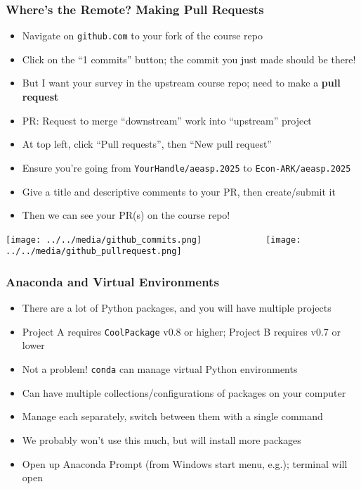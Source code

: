 \documentclass[aspectratio=169]{beamer}
\begin{document}
\begin{frame}
\frametitle{Where's the Remote? Making Pull Requests}
\begin{itemize}
	\item Navigate on \texttt{github.com} to your fork of the course repo
	
	\item Click on the ``1 commits'' button; the commit you just made should be there!
	
	\item <2->But I want your survey in the upstream course repo; need to make a \textbf{pull request}
	
	\item <2->PR: Request to merge ``downstream'' work into ``upstream'' project
	
	\item <3->At top left, click ``Pull requests'', then ``New pull request''
	
	\item <3->Ensure you're going from \texttt{YourHandle/aeasp.2025} to \texttt{Econ-ARK/aeasp.2025}
	
	\item <3->Give a title and descriptive comments to your PR, then create/submit it
	
	\item <4->Then we can see your PR(s) on the course repo!
\end{itemize}

\texttt{[image: ../../media/github\_commits.png]}~~~~~~~~~~~~~\texttt{[image: ../../media/github\_pullrequest.png]}

\end{frame}


\begin{frame}
\frametitle{Anaconda and Virtual Environments}
\begin{itemize}
	\item There are a lot of Python packages, and you will have multiple projects
	
	\item Project A requires \texttt{CoolPackage} v0.8 or higher; Project B requires v0.7 or lower
	
	\item <2->Not a problem! \texttt{conda} can manage virtual Python environments
	
	\item <2->Can have multiple collections/configurations of packages on your computer
	
	\item <2->Manage each separately, switch between them with a single command
	
	\item <3->We probably won't use this much, but will install more packages
	
	\item <3->Open up Anaconda Prompt (from Windows start menu, e.g.); terminal will open
\end{itemize}
\end{frame}
\end{document}

